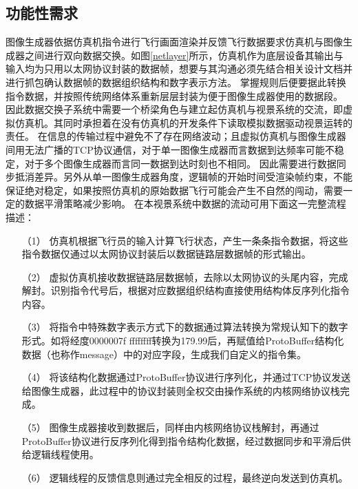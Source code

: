 \subsection{功能性需求}
图像生成器依据仿真机指令进行飞行画面渲染并反馈飞行数据要求仿真机与图像生成器之间进行双向数据交换。如图\ref{netlayer}所示，仿真机作为底层设备其输出与输入均为只用以太网协议封装的数据帧，想要与其沟通必须先结合相关设计文档并进行抓包确认数据帧的数据组织结构和数字表示方法。
掌握规则后便要据此转换指令数据，并按照传统网络体系重新层层封装为便于图像生成器使用的数据段。
因此数据交换子系统中需要一个桥梁角色与建立起仿真机与视景系统的交流，即虚拟仿真机。其同时承担着在没有仿真机的开发条件下读取模拟数据驱动视景运转的责任。
在信息的传输过程中避免不了存在网络波动；且虚拟仿真机与图像生成器间用无法广播的TCP协议通信，对于单一图像生成器而言数据到达频率可能不稳定，对于多个图像生成器而言同一数据到达时刻也不相同。
因此需要进行数据同步抵消差异。另外从单一图像生成器角度，逻辑帧的开始时间受渲染帧约束，不能保证绝对稳定，如果按照仿真机的原始数据飞行可能会产生不自然的闯动，需要一定的数据平滑策略减少影响。
在本视景系统中数据的流动可用下面这一完整流程描述：
\begin{itemize}
    \item [（1）]
    仿真机根据飞行员的输入计算飞行状态，产生一条条指令数据，将这些指令数据仅通过以太网协议封装后以数据链路层数据帧的形式输出。
    \item [（2）]
    虚拟仿真机接收数据链路层数据帧，去除以太网协议的头尾内容，完成解封。识别指令代号后，根据对应数据组织结构直接使用结构体反序列化指令内容。
    \item [（3）]
    将指令中特殊数字表示方式下的数据通过算法转换为常规认知下的数字形式。如将经度0000007f ffffffff转换为179.99后，再赋值给ProtoBuffer结构化数据（也称作message）中的对应字段，生成我们自定义的指令集。
    \item [（4）]
    将该结构化数据通过ProtoBuffer协议进行序列化，并通过TCP协议发送给图像生成器，此过程中的协议封装则全权交由操作系统的内核网络协议栈完成。
    \item [（5）]
    图像生成器接收到数据后，同样由内核网络协议栈解封，再通过ProtoBuffer协议进行反序列化得到指令结构化数据，经过数据同步和平滑后供给逻辑线程使用。
    \item [（6）]
    逻辑线程的反馈信息则通过完全相反的过程，最终逆向发送到仿真机。
\end{itemize}

